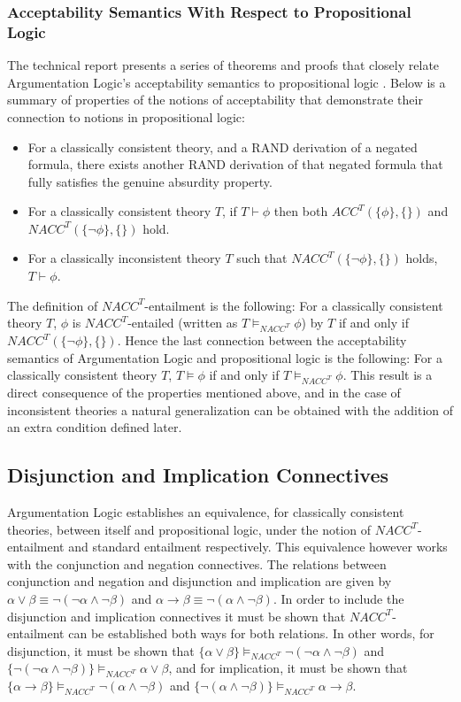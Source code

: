 \documentclass[11pt,twoside,a4paper]{report}
\begin{document}
\subsubsection{Acceptability Semantics With Respect to Propositional Logic}
The technical report presents a series of theorems and proofs that closely relate Argumentation Logic's acceptability semantics to propositional logic \citep*[pp. 10-11]{alpaper}. Below is a summary of properties of the notions of acceptability that demonstrate their connection to notions in propositional logic:
\begin{itemize}
\item
For a classically consistent theory, and a RAND derivation of a negated formula, there exists another RAND derivation of that negated formula that fully satisfies the genuine absurdity property.
\item
For a classically consistent theory $T$, if $T\vdash\phi$ then both $ACC^T(\{\phi\},\{\})$ and $NACC^T(\{\neg\phi\},\{\})$ hold.
\item
For a classically inconsistent theory $T$ such that $NACC^T(\{\neg\phi\},\{\})$ holds, $T\vdash\phi$.
\end{itemize}

The definition of $NACC^T$-entailment is the following: For a classically consistent theory $T$, $\phi$ is $NACC^T$-entailed (written as $T\models_{NACC^T}\phi$) by $T$ if and only if $NACC^T(\{\neg\phi\},\{\})$. Hence the last connection between the acceptability semantics of Argumentation Logic and propositional logic is the following: For a classically consistent theory $T$, $T\models\phi$ if and only if $T\models_{NACC^T}\phi$. 
This result is a direct consequence of the properties mentioned above, and in the case of inconsistent theories a natural generalization can be obtained with the addition of an extra condition defined later.

\subsection{Disjunction and Implication Connectives}
Argumentation Logic establishes an equivalence, for classically consistent theories, between itself and propositional logic, under the notion of $NACC^T$-entailment and standard entailment respectively. This equivalence however works with the conjunction and negation connectives. The relations between conjunction and negation and disjunction and implication are given by $\alpha\vee\beta \equiv \neg(\neg\alpha\wedge\neg\beta)$ and $\alpha\rightarrow\beta \equiv \neg(\alpha\wedge\neg\beta)$. In order to include the disjunction and implication connectives it must be shown that $NACC^T$-entailment can be established both ways for both relations. In other words, for disjunction, it must be shown that $\{\alpha\vee\beta\}\models_{NACC^T}\neg(\neg\alpha\wedge\neg\beta)$ and $\{\neg(\neg\alpha\wedge\neg\beta)\}\models_{NACC^T}\alpha\vee\beta$, and for implication, it must be shown that $\{\alpha\rightarrow\beta\}\models_{NACC^T}\neg(\alpha\wedge\neg\beta)$ and $\{\neg(\alpha\wedge\neg\beta)\}\models_{NACC^T}\alpha\rightarrow\beta$.
\end{document}
